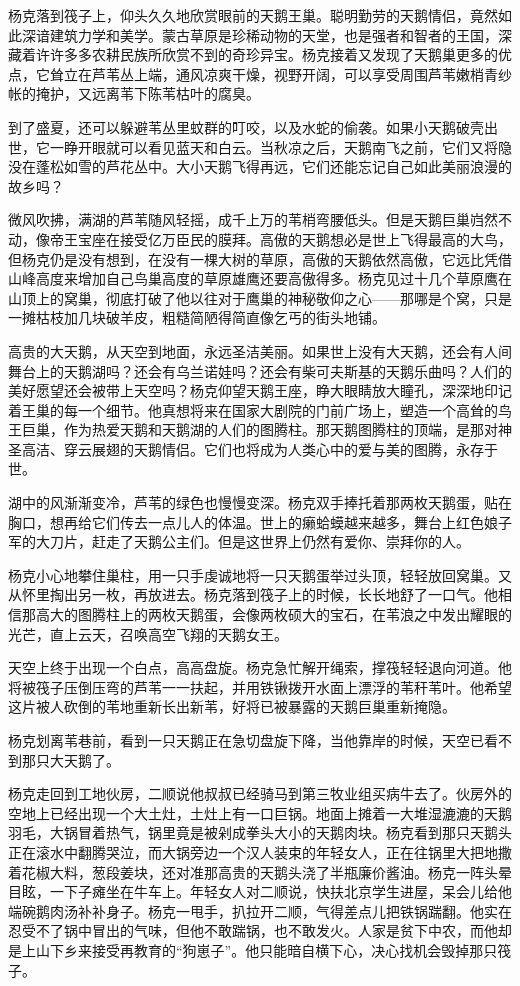 \par 杨克落到筏子上，仰头久久地欣赏眼前的天鹅王巢。聪明勤劳的天鹅情侣，竟然如此深谙建筑力学和美学。蒙古草原是珍稀动物的天堂，也是强者和智者的王国，深藏着许许多多农耕民族所欣赏不到的奇珍异宝。杨克接着又发现了天鹅巢更多的优点，它耸立在芦苇丛上端，通风凉爽干燥，视野开阔，可以享受周围芦苇嫩梢青纱帐的掩护，又远离苇下陈苇枯叶的腐臭。
\par 到了盛夏，还可以躲避苇丛里蚊群的叮咬，以及水蛇的偷袭。如果小天鹅破壳出世，它一睁开眼就可以看见蓝天和白云。当秋凉之后，天鹅南飞之前，它们又将隐没在蓬松如雪的芦花丛中。大小天鹅飞得再远，它们还能忘记自己如此美丽浪漫的故乡吗？
\par 微风吹拂，满湖的芦苇随风轻摇，成千上万的苇梢弯腰低头。但是天鹅巨巢岿然不动，像帝王宝座在接受亿万臣民的膜拜。高傲的天鹅想必是世上飞得最高的大鸟，但杨克仍是没有想到，在没有一棵大树的草原，高傲的天鹅依然高傲，它远比凭借山峰高度来增加自己鸟巢高度的草原雄鹰还要高傲得多。杨克见过十几个草原鹰在山顶上的窝巢，彻底打破了他以往对于鹰巢的神秘敬仰之心——那哪是个窝，只是一摊枯枝加几块破羊皮，粗糙简陋得简直像乞丐的街头地铺。
\par 高贵的大天鹅，从天空到地面，永远圣洁美丽。如果世上没有大天鹅，还会有人间舞台上的天鹅湖吗？还会有乌兰诺娃吗？还会有柴可夫斯基的天鹅乐曲吗？人们的美好愿望还会被带上天空吗？杨克仰望天鹅王座，睁大眼睛放大瞳孔，深深地印记着王巢的每一个细节。他真想将来在国家大剧院的门前广场上，塑造一个高耸的鸟王巨巢，作为热爱天鹅和天鹅湖的人们的图腾柱。那天鹅图腾柱的顶端，是那对神圣高洁、穿云展翅的天鹅情侣。它们也将成为人类心中的爱与美的图腾，永存于世。
\par 湖中的风渐渐变冷，芦苇的绿色也慢慢变深。杨克双手捧托着那两枚天鹅蛋，贴在胸口，想再给它们传去一点儿人的体温。世上的癞蛤蟆越来越多，舞台上红色娘子军的大刀片，赶走了天鹅公主们。但是这世界上仍然有爱你、崇拜你的人。
\par 杨克小心地攀住巢柱，用一只手虔诚地将一只天鹅蛋举过头顶，轻轻放回窝巢。又从怀里掏出另一枚，再放进去。杨克落到筏子上的时候，长长地舒了一口气。他相信那高大的图腾柱上的两枚天鹅蛋，会像两枚硕大的宝石，在苇浪之中发出耀眼的光芒，直上云天，召唤高空飞翔的天鹅女王。
\par 天空上终于出现一个白点，高高盘旋。杨克急忙解开绳索，撑筏轻轻退向河道。他将被筏子压倒压弯的芦苇一一扶起，并用铁锹拨开水面上漂浮的苇秆苇叶。他希望这片被人砍倒的苇地重新长出新苇，好将已被暴露的天鹅巨巢重新掩隐。
\par 杨克划离苇巷前，看到一只天鹅正在急切盘旋下降，当他靠岸的时候，天空已看不到那只大天鹅了。
\par 
\par 杨克走回到工地伙房，二顺说他叔叔已经骑马到第三牧业组买病牛去了。伙房外的空地上已经出现一个大土灶，土灶上有一口巨锅。地面上摊着一大堆湿漉漉的天鹅羽毛，大锅冒着热气，锅里竟是被剁成拳头大小的天鹅肉块。杨克看到那只天鹅头正在滚水中翻腾哭泣，而大锅旁边一个汉人装束的年轻女人，正在往锅里大把地撒着花椒大料，葱段姜块，还对准那高贵的天鹅头浇了半瓶廉价酱油。杨克一阵头晕目眩，一下子瘫坐在牛车上。年轻女人对二顺说，快扶北京学生进屋，呆会儿给他端碗鹅肉汤补补身子。杨克一甩手，扒拉开二顺，气得差点儿把铁锅踹翻。他实在忍受不了锅中冒出的气味，但他不敢踹锅，也不敢发火。人家是贫下中农，而他却是上山下乡来接受再教育的“狗崽子”。他只能暗自横下心，决心找机会毁掉那只筏子。
